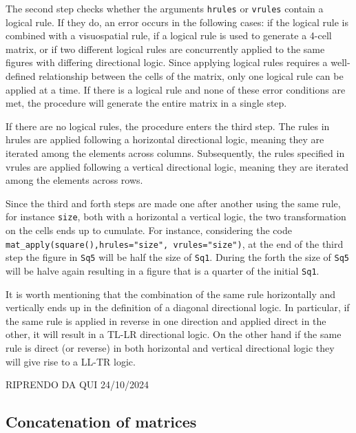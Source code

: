 
The second step checks whether the arguments \texttt{hrules} or \texttt{vrules} contain a logical rule.
If they do, an error occurs in the following cases: if the logical rule is combined with a visuospatial rule, if a logical rule is used to generate a 4-cell matrix, or if two different logical rules are concurrently applied to the same figures with differing directional logic.
Since applying logical rules requires a well-defined relationship between the cells of the matrix, only one logical rule can be applied at a time.
If there is a logical rule and none of these error conditions are met, the procedure will generate the entire matrix in a single step.

If there are no logical rules, the procedure enters the third step.
The rules in hrules are applied following a horizontal directional logic, meaning they are iterated among the elements across columns.
Subsequently, the rules specified in vrules are applied following a vertical directional logic, meaning they are iterated among the elements across rows.

Since the third and forth steps are made one after another using the same rule, for instance \texttt{size}, both with a horizontal a vertical logic, the two transformation on the cells ends up to cumulate.
For instance, considering the code \texttt{mat\_apply(square(),hrules="size",\ vrules="size")}, at the end of the third step the figure in \texttt{Sq5} will be half the size of \texttt{Sq1}.
During the forth the size of \texttt{Sq5} will be halve again resulting in a figure that is a quarter of the initial \texttt{Sq1}.

It is worth mentioning that the combination of the same rule horizontally and vertically ends up in the definition of a diagonal directional logic.
In particular, if the same rule is applied in reverse in one direction and applied direct in the other, it will result in a TL-LR directional logic.
On the other hand if the same rule is direct (or reverse) in both horizontal and vertical directional logic they will give rise to a LL-TR logic.

RIPRENDO DA QUI 24/10/2024

\subsection{Concatenation of matrices}\label{concatenation-of-matrices}

